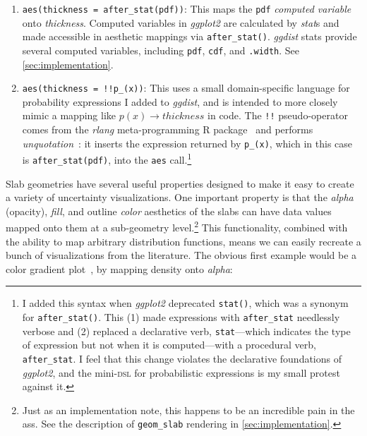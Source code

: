 \documentclass[journal]{vgtc}                     %
\begin{document}
\begin{enumerate}
    \item \texttt{aes(thickness = after\_stat(pdf))}: This maps the \texttt{pdf} \textit{computed variable} onto \textit{thickness}. Computed variables in \textit{ggplot2} are calculated by \textit{stat}s and made accessible in aesthetic mappings via \texttt{after\_stat()}. \textit{ggdist} stats provide several computed variables, including \texttt{pdf}, \texttt{cdf}, and \texttt{.width}. See \cref{sec:implementation}.
    \item \texttt{aes(thickness = !!p\_(x))}:  This uses a small domain-specific language for probability expressions I added to \textit{ggdist}, and is intended to more closely mimic a mapping like $p(x) \rightarrow thickness$ in code. The \texttt{!!} pseudo-operator comes from the \textit{rlang} meta-programming R package~\cite{henry2023rlang} and performs \textit{unquotation}~\cite{wickham2019advanced}: it inserts the expression returned by \texttt{p\_(x)}, which in this case is \texttt{after\_stat(pdf)}, into the \texttt{aes} call.\footnote{\label{foot:after-stat} I added this syntax when \textit{ggplot2} deprecated \texttt{stat()}, which was a synonym for \texttt{after\_stat()}. This (1) made expressions with \texttt{after\_stat} needlessly verbose and (2) replaced a declarative verb, \texttt{stat}---which indicates the type of expression but not when it is computed---with a procedural verb, \texttt{after\_stat}. I feel that this change violates the declarative foundations of \textit{ggplot2}, and the mini-\textsc{dsl} for probabilistic expressions is my small protest against it.}
\end{enumerate}

Slab geometries have several useful properties designed to make it easy to create a variety of uncertainty visualizations. One important property is that the \textit{alpha} (opacity), \textit{fill}, and outline \textit{color} aesthetics of the slabs can have data values mapped onto them at a sub-geometry level.\footnote{Just as an implementation note, this happens to be an incredible pain in the ass. See the description of \texttt{geom\_slab} rendering in \cref{sec:implementation}.} This functionality, combined with the ability to map arbitrary distribution functions, means we can easily recreate a bunch of visualizations from the literature. The obvious first example would be a color gradient plot~\cite{jackson2008displaying}, by mapping density onto \textit{alpha}:
\end{document}
